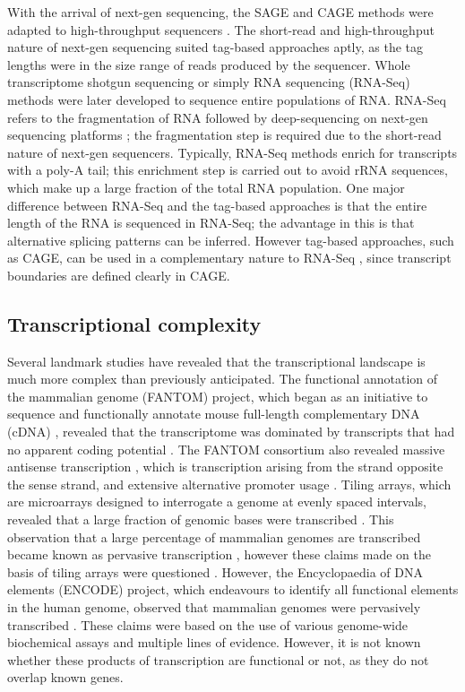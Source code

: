 With the arrival of next-gen sequencing, the SAGE and CAGE methods were adapted to high-throughput sequencers \citep{pmid14676315,Takahashi2012}. The short-read and high-throughput nature of next-gen sequencing suited tag-based approaches aptly, as the tag lengths were in the size range of reads produced by the sequencer. Whole transcriptome shotgun sequencing or simply RNA sequencing (RNA-Seq) methods were later developed to sequence entire populations of RNA. RNA-Seq refers to the fragmentation of RNA followed by deep-sequencing on next-gen sequencing platforms \citep{pmid19015660}; the fragmentation step is required due to the short-read nature of next-gen sequencers. Typically, RNA-Seq methods enrich for transcripts with a poly-A tail; this enrichment step is carried out to avoid rRNA sequences, which make up a large fraction of the total RNA population. One major difference between RNA-Seq and the tag-based approaches is that the entire length of the RNA is sequenced in RNA-Seq; the advantage in this is that alternative splicing patterns can be inferred. However tag-based approaches, such as CAGE, can be used in a complementary nature to RNA-Seq \citep{pmid24676093}, since transcript boundaries are defined clearly in CAGE.

\subsection{Transcriptional complexity}

Several landmark studies have revealed that the transcriptional landscape is much more complex than previously anticipated. The functional annotation of the mammalian genome (FANTOM) project, which began as an initiative to sequence and functionally annotate mouse full-length complementary DNA (cDNA) \citep{pmid11217851}, revealed that the transcriptome was dominated by transcripts that had no apparent coding potential \citep{pmid12466851}. The FANTOM consortium also revealed massive antisense transcription \citep{pmid16141073}, which is transcription arising from the strand opposite the sense strand, and extensive alternative promoter usage \citep{pmid16141072}. Tiling arrays, which are microarrays designed to interrogate a genome at evenly spaced intervals, revealed that a large fraction of genomic bases were transcribed \citep{pmid15539566, pmid11988577, pmid15790807}. This observation that a large percentage of mammalian genomes are transcribed became known as pervasive transcription \citep{pmid17510325}, however these claims made on the basis of tiling arrays were questioned \citep{pmid20502517}. However, the Encyclopaedia of DNA elements (ENCODE) project, which endeavours to identify all functional elements in the human genome, observed that mammalian genomes were pervasively transcribed \citep{pmid17571346, pmid22955616}. These claims were based on the use of various genome-wide biochemical assays and multiple lines of evidence. However, it is not known whether these products of transcription are functional or not, as they do not overlap known genes.

